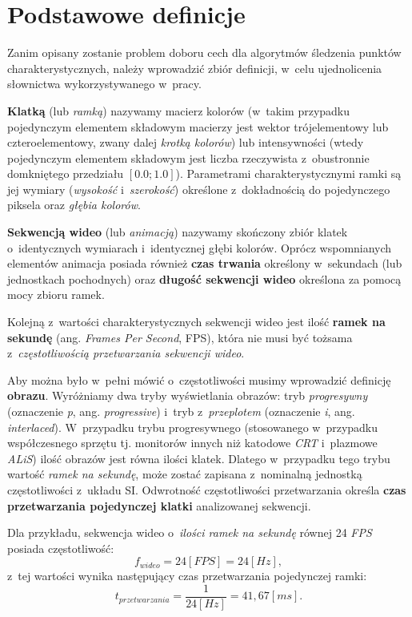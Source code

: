   \section{Podstawowe definicje}\label{Section_Definicje}
    Zanim opisany zostanie problem doboru cech dla algorytmów śledzenia punktów charakterystycznych, należy wprowadzić zbiór definicji, w~celu ujednolicenia słownictwa wykorzystywanego w~pracy.

    \textbf{Klatką} (lub \textit{ramką}) nazywamy macierz kolorów (w~takim przypadku pojedynczym elementem składowym macierzy jest wektor trójelementowy lub czteroelementowy, zwany dalej \textit{krotką kolorów}) lub intensywności (wtedy pojedynczym elementem składowym jest liczba rzeczywista z~obustronnie domkniętego przedziału $[0.0; 1.0]$). Parametrami charakterystycznymi ramki są jej wymiary (\textit{wysokość} i~\textit{szerokość}) określone z~dokładnością do pojedynczego piksela oraz \textit{głębia kolorów}.

    \textbf{Sekwencją wideo} (lub \textit{animacją}) nazywamy skończony zbiór klatek o~identycznych wymiarach i~identycznej głębi kolorów. Oprócz wspomnianych elementów animacja posiada również \textbf{czas trwania} określony w~sekundach (lub jednostkach pochodnych) oraz \textbf{długość sekwencji wideo} określona za pomocą mocy zbioru ramek.

    Kolejną z~wartości charakterystycznych sekwencji wideo jest ilość \textbf{ramek na sekundę} (ang. \textit{Frames Per Second}, FPS), która nie musi być tożsama z~\textit{częstotliwością przetwarzania sekwencji wideo}.

    Aby można było w~pełni mówić o~częstotliwości musimy wprowadzić definicję \textbf{obrazu}. Wyróżniamy dwa tryby wyświetlania obrazów: tryb \textit{progresywny} (oznaczenie \textit{p}, ang. \textit{progressive}) i~tryb z~\textit{przeplotem} (oznaczenie \textit{i}, ang. \textit{interlaced}). W~przypadku trybu progresywnego (stosowanego w~przypadku współczesnego sprzętu tj. monitorów innych niż katodowe \textit{CRT} i~plazmowe \textit{ALiS}) ilość obrazów jest równa ilości klatek. Dlatego w~przypadku tego trybu wartość \textit{ramek na sekundę}, może zostać zapisana z~nominalną jednostką częstotliwości z~układu SI. Odwrotność częstotliwości przetwarzania określa \textbf{czas przetwarzania pojedynczej klatki} analizowanej sekwencji.

    Dla przykładu, sekwencja wideo o~\textit{ilości ramek na sekundę} równej 24 \textit{FPS} posiada częstotliwość: \[ f_{wideo} = 24 [FPS] = 24 [Hz], \] z~tej wartości wynika następujący czas przetwarzania pojedynczej ramki: \[ t_{przetwarzania} = \frac{1}{24 [Hz]} = 41,67 [ms]. \]

